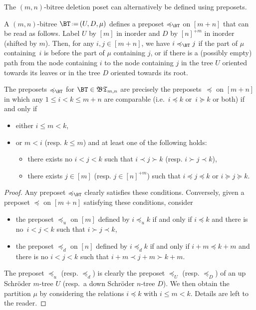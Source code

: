 \documentclass[AHL,Unicode,longabstracts,published]{cedram}
\newcommand{\f}[1]{\mathfrak{#1}}
\newcommand{\eqdef}{\mbox{\,\raisebox{0.2ex}{\scriptsize\ensuremath{\mathrm:}}\ensuremath{=}\,}}
\newcommand{\ie}{i.e.~}
\begin{document}
The $(m,n)$-bitree deletion poset can alternatively be defined using preposets.

\begin{defi}\label{def:bitreePreposet}
A $(m,n)$-bitree $\BT \eqdef (U, D, \mu)$ defines a preposet $\preccurlyeq_{\BT}$ on $[m+n]$ that can be read as follows. Label $U$ by $[m]$ in inorder and $D$ by $[n]^{+m}$ in inorder (shifted by $m$). Then, for any $i,j \in [m+n]$, we have $i \preccurlyeq_{\BT} j$ if the part of $\mu$ containing~$i$ is before the part of $\mu$ containing $j$, or if there is a (possibly empty) path from the node containing $i$ to the node containing $j$ in the tree $U$ oriented towards its leaves or in the tree $D$ oriented towards its root.
\end{defi}

\begin{prop}\label{prop:characterizationBitreePreposets}
The preposets $\preccurlyeq_{\BT}$ for $\BT \in \f{BT}_{m,n}$ are precisely the preposets~$\preccurlyeq$ on $[m+n]$ in which any $1 \le i < k \le m+n$ are comparable (\ie $i \preccurlyeq k$ or~$i \succcurlyeq k$ or both) if and only if
\begin{itemize}
\item either $i \le m < k$,
\item or $m < i$ (resp. $k \le m$) and at least one of the following holds:
\begin{itemize}
\item there exists no $i < j < k$ such that $i \prec j \succ k$ (resp. $i \succ j \prec k$),
\item there exists $j \in [m]$ (resp. $j \in [n]^{+m}$) such that $i \preccurlyeq j \preccurlyeq k$ or $i \succcurlyeq j \succcurlyeq k$.
\end{itemize}
\end{itemize}
\end{prop}

\begin{proof}
Any preposet $\preccurlyeq_{\BT}$ clearly satisfies these conditions. Conversely, given a preposet $\preccurlyeq$ on ${[m+n]}$ satisfying these conditions, consider
\begin{itemize}
\item the preposet $\preccurlyeq_u$ on $[m]$ defined by $i \preccurlyeq_u k$ if and only if $i \preccurlyeq k$ and there is no~$i < j < k$ such that $i \succ j \prec k$,
\item the preposet $\preccurlyeq_d$ on $[n]$ defined by $i \preccurlyeq_d k$ if and only if ${i + m \preccurlyeq k+m}$ and there is no ${i < j < k}$ such that $i + m \prec j + m \succ k + m$.
\end{itemize}
The preposet $\preccurlyeq_u$ (resp. $\preccurlyeq_d$) is clearly the preposet $\preccurlyeq_U$ (resp. $\preccurlyeq_D$) of an up Schr\"oder $m$-tree $U$ (resp.~a down Schr\"oder $n$-tree $D$). We then obtain the partition $\mu$ by considering the relations $i \preccurlyeq k$ with $i \le m < k$. Details are left to the reader.
\end{proof}
\end{document}

